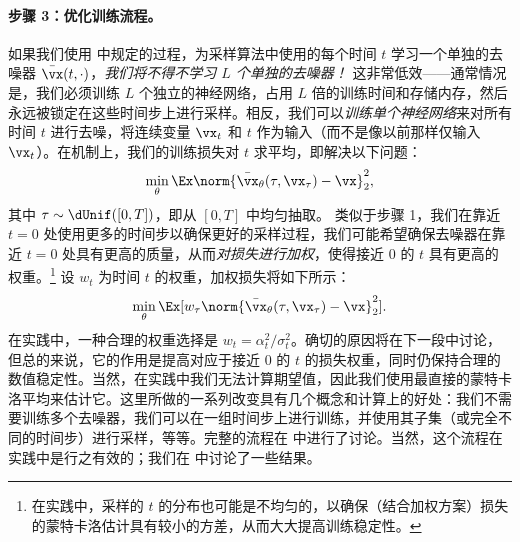 \documentclass[../../book-main_zh.tex]{subfiles}
\begin{document}
\paragraph{步骤 3：优化训练流程。} 如果我们使用  中规定的过程，为采样算法中使用的每个时间 \(t\) 学习一个单独的去噪器 \(\bar{\vx}(t, \cdot)\)，\textit{我们将不得不学习 \(L\) 个单独的去噪器！} 这非常低效——通常情况是，我们必须训练 \(L\) 个独立的神经网络，占用 \(L\) 倍的训练时间和存储内存，然后永远被锁定在这些时间步上进行采样。相反，我们可以\textit{训练单个神经网络}来对所有时间 \(t\) 进行去噪，将连续变量 \(\vx_{t}\) 和 \(t\) 作为输入（而不是像以前那样仅输入 \(\vx_{t}\)）。在机制上，我们的训练损失对 \(t\) 求平均，即解决以下问题：
\begin{equation}\label{eq:training loss}
    \min_{\theta}\Ex\norm{\bar{\vx}_{\theta}(\tau,
    \vx_{\tau}) - \vx}_{2}^{2},
\end{equation}
其中 \(\tau \sim \dUnif([0, T])\)，即从 \([0, T]\) 中均匀抽取。
类似于步骤 1，我们在靠近 \(t = 0\) 处使用更多的时间步以确保更好的采样过程，我们可能希望确保去噪器在靠近 \(t = 0\) 处具有更高的质量，从而\textit{对损失进行加权}，使得接近 \(0\) 的 \(t\) 具有更高的权重。\footnote{在实践中，采样的 \(t\) 的分布也可能是不均匀的，以确保（结合加权方案）损失的蒙特卡洛估计具有较小的方差，从而大大提高训练稳定性。}
设 \(w_{t}\) 为时间 \(t\) 的权重，加权损失将如下所示：
\begin{equation}\label{eq:parametric_denoising_loss}
    \min_{\theta}\Ex[w_{\tau}\norm{\bar{\vx}_{\theta}(\tau,
    \vx_{\tau}) - \vx}_{2}^{2}].
\end{equation}
在实践中，一种合理的权重选择是 \(w_{t} =
\alpha_{t}^{2}/\sigma_{t}^{2}\)。确切的原因将在下一段中讨论，但总的来说，它的作用是提高对应于接近 \(0\) 的 \(t\) 的损失权重，同时仍保持合理的数值稳定性。当然，在实践中我们无法计算期望值，因此我们使用最直接的蒙特卡洛平均来估计它。这里所做的一系列改变具有几个概念和计算上的好处：我们不需要训练多个去噪器，我们可以在一组时间步上进行训练，并使用其子集（或完全不同的时间步）进行采样，等等。完整的流程在  中进行了讨论。当然，这个流程在实践中是行之有效的；我们在  中讨论了一些结果。
\end{document}
